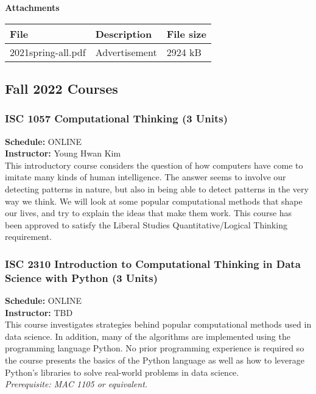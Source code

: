 \documentclass[12pt,a4paper]{article}
\begin{document}
\begin{center}
\textbf{Attachments}
\begin{tabular}{l l l}
\hline
\textbf{File} & \textbf{Description} & \textbf{File size} \\ \hline
2021spring-all.pdf & Advertisement & 2924 kB \\ \hline
\end{tabular}
\end{center}
\newpage

\subsection{Fall 2022 Courses}
\subsubsection*{ISC 1057 Computational Thinking (3 Units)}
\textbf{Schedule:} ONLINE \\
\textbf{Instructor:} Young Hwan Kim \\
This introductory course considers the question of how computers have come to imitate many kinds of human intelligence. The answer seems to involve our detecting patterns in nature, but also in being able to detect patterns in the very way we think. We will look at some popular computational methods that shape our lives, and try to explain the ideas that make them work. This course has been approved to satisfy the Liberal Studies Quantitative/Logical Thinking requirement.

\subsubsection*{ISC 2310 Introduction to Computational Thinking in Data Science with Python (3 Units)}
\textbf{Schedule:} ONLINE \\
\textbf{Instructor:} TBD \\
This course investigates strategies behind popular computational methods used in data science. In addition, many of the algorithms are implemented using the programming language Python. No prior programming experience is required so the course presents the basics of the Python language as well as how to leverage Python’s libraries to solve real-world problems in data science. \\
\textit{Prerequisite: MAC 1105 or equivalent.}
\end{document}
